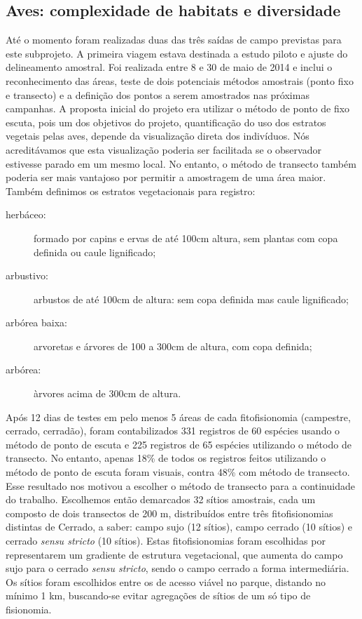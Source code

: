 \subsection{Aves: complexidade de habitats e diversidade} %
\label{sec:compl-de-habit} 

Até o momento foram realizadas duas das três saídas de campo previstas
para este subprojeto. A primeira viagem estava destinada a estudo piloto
e ajuste do delineamento amostral. Foi realizada entre 8 e 30 de
maio de 2014 e inclui o reconhecimento das áreas, teste de dois
potenciais métodos amostrais (ponto fixo e transecto) e a definição dos pontos a serem
amostrados nas próximas campanhas. 
A proposta inicial do projeto era utilizar o método de ponto de
fixo escuta, pois um dos objetivos do projeto, quantificação do uso dos
estratos vegetais pelas aves, depende da visualização direta dos
indivíduos. Nós acreditávamos que esta visualização poderia ser
facilitada se o observador estivesse parado em um mesmo local. No
entanto, o método de transecto também poderia ser mais vantajoso por
permitir a amostragem de uma área maior. 
Também definimos os estratos vegetacionais para registro: 
\begin{description}
\item[herbáceo:] formado por capins e ervas de até 100cm altura, sem plantas com copa definida ou caule lignificado;
\item[arbustivo:] arbustos de até 100cm de altura: sem copa definida mas caule lignificado;
\item[arbórea baixa:] arvoretas e árvores de 100 a 300cm de altura, com copa definida;
\item[arbórea:] àrvores acima de 300cm de altura. 
\end{description}

 Após 12 dias de testes em 
pelo menos 5 áreas de cada fitofisionomia (campestre, cerrado, cerradão),
foram contabilizados 331 registros de 60 espécies usando o método de
ponto de escuta e 225 registros de 65 espécies utilizando o método de
transecto. No entanto, apenas 18\% de todos os registros feitos
utilizando o método de ponto de escuta foram visuais, contra 48\%
com  método de transecto. Esse resultado nos motivou a escolher o método de
transecto para a continuidade do trabalho.
Escolhemos então demarcados 32 sítios amostrais,
cada um composto de dois transectos de 200 m, distribuídos entre três
fitofisionomias distintas de Cerrado, a saber: campo sujo (12 sítios), campo
cerrado (10 sítios) e cerrado \textit{sensu stricto} (10 sítios). 
Estas fitofisionomias foram
escolhidas por representarem um gradiente de estrutura vegetacional,
que aumenta do campo sujo para o cerrado \textit{sensu stricto}, sendo
o campo cerrado a forma intermediária. Os sítios foram escolhidos entre
os de acesso viável no parque, distando no mínimo 1 km, buscando-se
evitar agregações de sítios de um só tipo de fisionomia.

